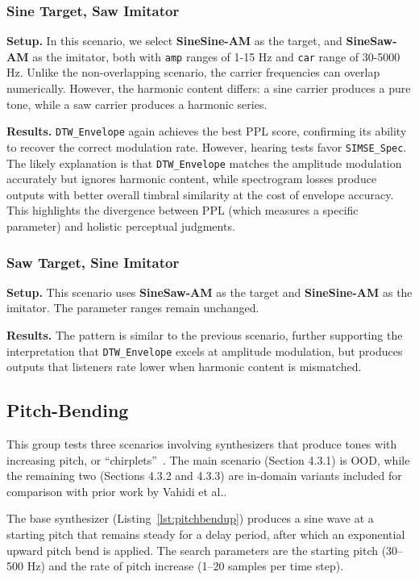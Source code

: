 \documentclass[10pt]{article} %
\newcommand{\SIMSESpec}{\texttt{SIMSE\_\allowbreak Spec}\xspace}
\newcommand{\DTWEnv}{\texttt{DTW\_\allowbreak Envelope}\xspace}
\newcommand{\FMMod}{\textbf{SineSaw-AM}\xspace}
\newcommand{\FMModvtwo}{\textbf{SineSine-AM}\xspace}
\begin{document}
\subsubsection{Sine Target, Saw Imitator}
\label{sec:am_sinetarget_sawimitate}
\textbf{Setup.} In this scenario, we select \FMModvtwo as the target, and \FMMod as the imitator, both with \texttt{amp} ranges of 1-15 Hz and \texttt{car} range of 30-5000 Hz. Unlike the non-overlapping scenario, the carrier frequencies can overlap numerically. However, the harmonic content differs: a sine carrier produces a pure tone, while a saw carrier produces a harmonic series.

\noindent \textbf{Results.} \DTWEnv again achieves the best PPL score, confirming its ability to recover the correct modulation rate. However, hearing tests favor \SIMSESpec. The likely explanation is that \DTWEnv  matches the amplitude modulation accurately but ignores harmonic content, while spectrogram losses produce outputs with better overall timbral similarity at the cost of envelope accuracy. This highlights the divergence between PPL (which measures a specific parameter) and holistic perceptual judgments.


\subsubsection{Saw Target, Sine Imitator}
\label{sec:am_sawtarget_sineimitate}
\textbf{Setup.} This scenario uses \FMMod as the target and \FMModvtwo as the imitator. The parameter ranges remain unchanged. 

\noindent \textbf{Results.}  The pattern is similar to the previous scenario, further supporting the interpretation that \DTWEnv excels at amplitude modulation, but produces outputs that listeners rate lower when harmonic content is mismatched.


\subsection{Pitch-Bending}
\label{sec:chirplet_scenarios}
This group tests three scenarios involving synthesizers that produce tones with increasing pitch, or ``chirplets''~\cite{mann1995chirplet,lostanlen2019shape}. The main scenario (Section 4.3.1) is OOD, while the remaining two (Sections 4.3.2 and 4.3.3) are in-domain variants included for comparison with prior work by Vahidi et al.\cite{vahidi2023mesostructures}. 

The base synthesizer (Listing~\ref{lst:pitchbendup}) produces a sine wave at a starting pitch that remains steady for a delay period, after which an exponential upward pitch bend is applied. The search parameters are the starting pitch (30–500 Hz) and the rate of pitch increase (1–20 samples per time step).
\end{document}
